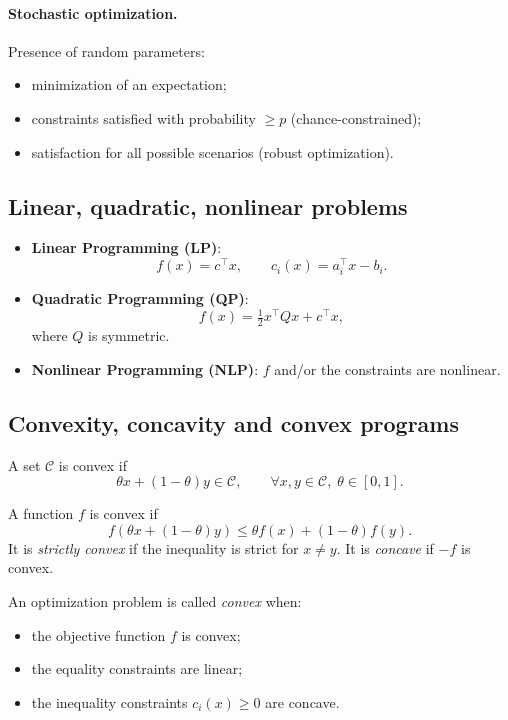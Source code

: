 \paragraph{Stochastic optimization.}
Presence of random parameters:
\begin{itemize}
  \item minimization of an expectation;
  \item constraints satisfied with probability $\ge p$ (chance-constrained);
  \item satisfaction for all possible scenarios (robust optimization).
\end{itemize}

\subsection{Linear, quadratic, nonlinear problems}

\begin{itemize}
  \item \textbf{Linear Programming (LP)}:
  \[
  f(x)=c^\top x,\qquad c_i(x)=a_i^\top x - b_i.
  \]

  \item \textbf{Quadratic Programming (QP)}:
  \[
  f(x)=\tfrac12 x^\top Q x + c^\top x,
  \]
  where $Q$ is symmetric.

  \item \textbf{Nonlinear Programming (NLP)}:
  $f$ and/or the constraints are nonlinear.
\end{itemize}

\subsection{Convexity, concavity and convex programs}

\begin{definition}
A set $\mathcal{C}$ is convex if  
\[
\theta x + (1-\theta)y \in \mathcal{C},\qquad \forall x,y\in\mathcal{C},\;\theta\in[0,1].
\]
\end{definition}

\begin{definition}
A function $f$ is convex if  
\[
f(\theta x + (1-\theta)y)\le \theta f(x)+(1-\theta)f(y).
\]
It is \emph{strictly convex} if the inequality is strict for $x\neq y$.
It is \emph{concave} if $-f$ is convex.
\end{definition}

\begin{definition}
An optimization problem is called \emph{convex} when:
\begin{itemize}
  \item the objective function $f$ is convex;
  \item the equality constraints are linear;
  \item the inequality constraints $c_i(x)\ge 0$ are concave.
\end{itemize}
\end{definition}

